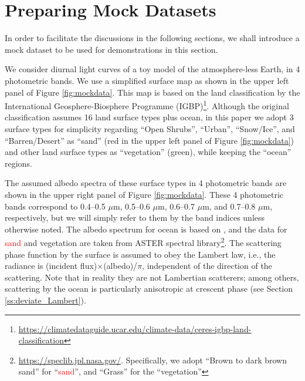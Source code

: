 \documentclass[iop,numberedappendix,apj]{emulateapj}
\def\edit#1{\textcolor{red}{#1}}
\def\memoJLY#1{\color{green}[JLY: {\bf #1}]\color{black}}
\begin{document}
\section{Preparing Mock Datasets}
\label{s:mockdata}

In order to facilitate the discussions in the following sections, we shall introduce a mock dataset to be used for demonstrations in this section. 

We consider diurnal light curves of a toy model of the atmosphere-less Earth, in 4 photometric bands. 
We use a simplified surface map as shown in the upper left panel of Figure \ref{fig:mockdata}. 
This map is based on the land classification by the International Geosphere-Biosphere Programme (IGBP)\footnote{\url{https://climatedataguide.ucar.edu/climate-data/ceres-igbp-land-classification}}. 
Although the original classification assumes 16 land surface types plus ocean, in this paper we adopt 3 surface types for simplicity regarding ``Open Shrubs'', ``Urban'', ``Snow/Ice'', and ``Barren/Desert'' as ``sand'' (red in the upper left panel of Figure \ref{fig:mockdata}) and other land surface types as ``vegetation'' (green), while keeping the ``ocean'' regions. 


The assumed albedo spectra of these surface types in 4 photometric bands are shown in the upper right panel of Figure \ref{fig:mockdata}. 
These 4 photometric bands correspond to 0.4--0.5 $\mu $m, 0.5--0.6 $\mu $m, 0.6--0.7 $\mu $m, and 0.7--0.8 $\mu $m, respectively, but we will simply refer to them by the band indices unless otherwise noted. 
The albedo spectrum for ocean is based on \citet{Mclinden1997}, 
and the data for \edit{sand} and vegetation are taken from ASTER spectral library\footnote{\url{https://speclib.jpl.nasa.gov/}. 
Specifically, we adopt  ``Brown to dark brown sand'' for ``\edit{sand}'', and ``Grass'' for the ``vegetation''}. 
The scattering phase function by the surface is assumed to obey the Lambert law, i.e., the radiance is (incident flux)$\times $(albedo)/$\pi$, independent of the direction of the scattering. 
Note that in reality they are not Lambertian scatterers; among others,  scattering by the ocean is particularly anisotropic at crescent phase (see Section \ref{ss:deviate_Lambert}).  
\end{document}

